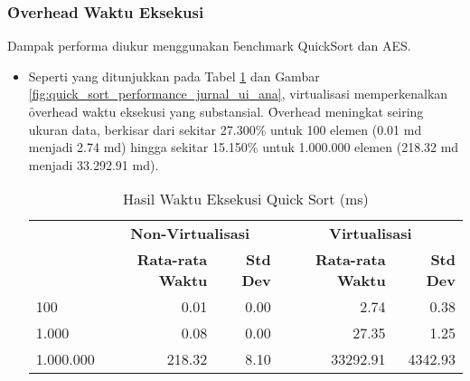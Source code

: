 \subsubsection{\f{Overhead} Waktu Eksekusi}
Dampak performa diukur menggunakan \f{benchmark} QuickSort dan AES.
\begin{itemize}
    \item {} Seperti yang ditunjukkan pada Tabel \ref{tab:quick_sort_performance_jurnal_ui_ana} dan Gambar \ref{fig:quick_sort_performance_jurnal_ui_ana}, virtualisasi memperkenalkan \f{overhead} waktu eksekusi yang substansial. \f{Overhead} meningkat seiring ukuran data, berkisar dari sekitar 27.300\% untuk 100 elemen (0.01 md menjadi 2.74 md) hingga sekitar 15.150\% untuk 1.000.000 elemen (218.32 md menjadi 33.292.91 md).
    \begin{table}[H]
        \centering
        \caption{Hasil Waktu Eksekusi Quick Sort (ms)}
        \label{tab:quick_sort_performance_jurnal_ui_ana}
        \fontsize{12}{12}\selectfont %
        \begin{tabular}{@{}lrrrr@{}}
            \toprule
            \fontsize{10}{12}\selectfont %
            \multirow{2}{*}{\textbf{Ukuran Array}} & \multicolumn{2}{c}{\textbf{Non-Virtualisasi}} & \multicolumn{2}{c}{\textbf{Virtualisasi}} \\
            \cmidrule(lr){2-3} \cmidrule(lr){4-5}
            & \textbf{Rata-rata Waktu} & \textbf{Std Dev} & \textbf{Rata-rata Waktu} & \textbf{Std Dev} \\
            \midrule
            100       & 0.01    & 0.00    & 2.74      & 0.38     \\
            1.000     & 0.08    & 0.00    & 27.35     & 1.25     \\
            1.000.000 & 218.32  & 8.10    & 33292.91  & 4342.93  \\
            \bottomrule
        \end{tabular}
    \end{table}


\end{itemize}
